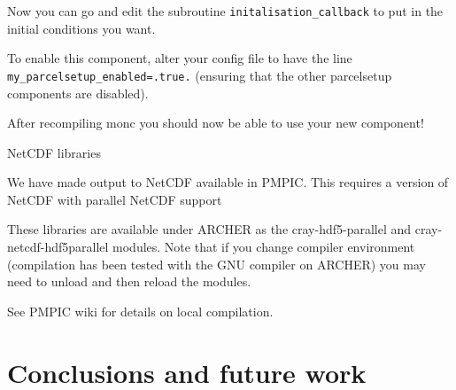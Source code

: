 \documentclass{beamer}
\newenvironment{Shaded}{}{}
\newcommand{\KeywordTok}[1]{\textcolor[rgb]{0.13,0.29,0.53}{\textbf{{#1}}}}
\newcommand{\DataTypeTok}[1]{\textcolor[rgb]{0.13,0.29,0.53}{{#1}}}
\newcommand{\FloatTok}[1]{\textcolor[rgb]{0.00,0.00,0.81}{{#1}}}
\newcommand{\StringTok}[1]{\textcolor[rgb]{0.31,0.60,0.02}{{#1}}}
\newcommand{\OperatorTok}[1]{\textcolor[rgb]{0.81,0.36,0.00}{\textbf{{#1}}}}
\newcommand{\NormalTok}[1]{{#1}}
\begin{document}
\begin{frame}[fragile]

\begin{footnotesize}
\begin{Shaded}
\end{Shaded}
\end{footnotesize}

Now you can go and edit the subroutine \texttt{initalisation\_callback}
to put in the initial conditions you want.

To enable this component, alter your config file to have the line
\texttt{my\_parcelsetup\_enabled=.true.} (ensuring that the other
parcelsetup components are disabled).

After recompiling monc you should now be able to use your new component!

\end{frame}

\begin{frame}[fragile]{NetCDF libraries}
\protect\hypertarget{netcdf-libraries}{}

We have made output to NetCDF available in PMPIC. This requires a
version of NetCDF with parallel NetCDF support

These libraries are available under ARCHER as the cray-hdf5-parallel and
cray-netcdf-hdf5parallel modules. Note that if you change compiler
environment (compilation has been tested with the GNU compiler on
ARCHER) you may need to unload and then reload the modules.

See PMPIC wiki for details on local compilation.

\end{frame}
 
\section{Conclusions and future work}
\end{document}
